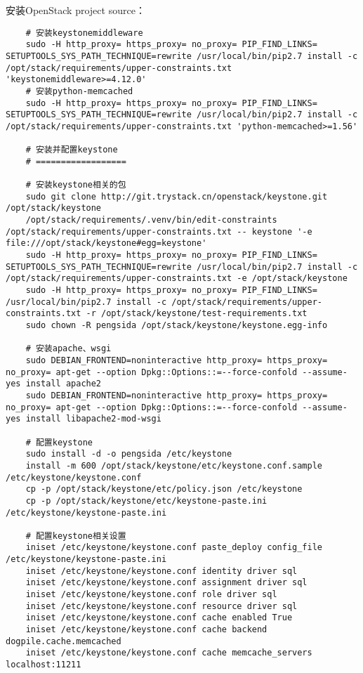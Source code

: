 \documentclass[a4paper,left=1.5cm,right=1.5cm,11pt]{article}
\begin{document}
	安装OpenStack project source：
	\begin{lstlisting}
	# 安装keystonemiddleware
	sudo -H http_proxy= https_proxy= no_proxy= PIP_FIND_LINKS= SETUPTOOLS_SYS_PATH_TECHNIQUE=rewrite /usr/local/bin/pip2.7 install -c /opt/stack/requirements/upper-constraints.txt 'keystonemiddleware>=4.12.0'
	# 安装python-memcached
	sudo -H http_proxy= https_proxy= no_proxy= PIP_FIND_LINKS= SETUPTOOLS_SYS_PATH_TECHNIQUE=rewrite /usr/local/bin/pip2.7 install -c /opt/stack/requirements/upper-constraints.txt 'python-memcached>=1.56'

	# 安装并配置keystone
	# ==================

	# 安装keystone相关的包
	sudo git clone http://git.trystack.cn/openstack/keystone.git /opt/stack/keystone
	/opt/stack/requirements/.venv/bin/edit-constraints /opt/stack/requirements/upper-constraints.txt -- keystone '-e file:///opt/stack/keystone#egg=keystone'
	sudo -H http_proxy= https_proxy= no_proxy= PIP_FIND_LINKS= SETUPTOOLS_SYS_PATH_TECHNIQUE=rewrite /usr/local/bin/pip2.7 install -c /opt/stack/requirements/upper-constraints.txt -e /opt/stack/keystone
	sudo -H http_proxy= https_proxy= no_proxy= PIP_FIND_LINKS= /usr/local/bin/pip2.7 install -c /opt/stack/requirements/upper-constraints.txt -r /opt/stack/keystone/test-requirements.txt
	sudo chown -R pengsida /opt/stack/keystone/keystone.egg-info

	# 安装apache、wsgi
	sudo DEBIAN_FRONTEND=noninteractive http_proxy= https_proxy= no_proxy= apt-get --option Dpkg::Options::=--force-confold --assume-yes install apache2
	sudo DEBIAN_FRONTEND=noninteractive http_proxy= https_proxy= no_proxy= apt-get --option Dpkg::Options::=--force-confold --assume-yes install libapache2-mod-wsgi

	# 配置keystone
	sudo install -d -o pengsida /etc/keystone
	install -m 600 /opt/stack/keystone/etc/keystone.conf.sample /etc/keystone/keystone.conf
    cp -p /opt/stack/keystone/etc/policy.json /etc/keystone
    cp -p /opt/stack/keystone/etc/keystone-paste.ini /etc/keystone/keystone-paste.ini

	# 配置keystone相关设置
	iniset /etc/keystone/keystone.conf paste_deploy config_file /etc/keystone/keystone-paste.ini
	iniset /etc/keystone/keystone.conf identity driver sql
    iniset /etc/keystone/keystone.conf assignment driver sql
    iniset /etc/keystone/keystone.conf role driver sql
    iniset /etc/keystone/keystone.conf resource driver sql
    iniset /etc/keystone/keystone.conf cache enabled True
    iniset /etc/keystone/keystone.conf cache backend dogpile.cache.memcached
    iniset /etc/keystone/keystone.conf cache memcache_servers localhost:11211


\end{lstlisting}
\end{document}

